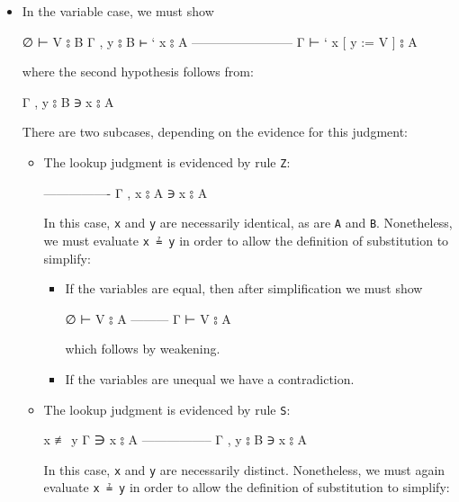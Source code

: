\begin{itemize}
\item
  In the variable case, we must show

  \begin{myDisplay}
  ∅ ⊢ V ⦂ B
  Γ , y ⦂ B ⊢ ` x ⦂ A
  ------------------------
  Γ ⊢ ` x [ y := V ] ⦂ A
  \end{myDisplay}

  where the second hypothesis follows from:

  \begin{myDisplay}
  Γ , y ⦂ B ∋ x ⦂ A
  \end{myDisplay}

  There are two subcases, depending on the evidence for this judgment:

  \begin{itemize}
  \item
    The lookup judgment is evidenced by rule \texttt{Z}:

    \begin{myDisplay}
    ----------------
    Γ , x ⦂ A ∋ x ⦂ A
    \end{myDisplay}

    In this case, \texttt{x} and \texttt{y} are necessarily identical,
    as are \texttt{A} and \texttt{B}. Nonetheless, we must evaluate
    \texttt{x\ ≟\ y} in order to allow the definition of substitution to
    simplify:

    \begin{itemize}
    \item
      If the variables are equal, then after simplification we must show

      \begin{myDisplay}
      ∅ ⊢ V ⦂ A
      ---------
      Γ ⊢ V ⦂ A
      \end{myDisplay}

      which follows by weakening.
    \item
      If the variables are unequal we have a contradiction.
    \end{itemize}
  \item
    The lookup judgment is evidenced by rule \texttt{S}:

    \begin{myDisplay}
    x ≢ y
    Γ ∋ x ⦂ A
    -----------------
    Γ , y ⦂ B ∋ x ⦂ A
    \end{myDisplay}

    In this case, \texttt{x} and \texttt{y} are necessarily distinct.
    Nonetheless, we must again evaluate \texttt{x\ ≟\ y} in order to
    allow the definition of substitution to simplify:


\end{itemize}
\end{itemize}
